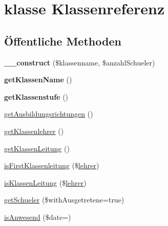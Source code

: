 \hypertarget{classklasse}{}\section{klasse Klassenreferenz}
\label{classklasse}
\subsection*{Öffentliche Methoden}
\begin{DoxyCompactItemize}
\item 
\mbox{\label{classklasse_a470f7dbc69c9b3dadac7ac68a5cf86ca}} 
{\bfseries \+\_\+\+\_\+construct} (\$klassenname, \$anzahl\+Schueler)
\item 
\mbox{\label{classklasse_ab82a9c3ea2ef364ca74f7b56ffb25ce2}} 
{\bfseries get\+Klassen\+Name} ()
\item 
\mbox{\label{classklasse_adee8673c2ad4ed4be48221f31452b8ef}} 
{\bfseries get\+Klassenstufe} ()
\item 
\mbox{\hyperlink{classklasse_ad27975ea62d4436f903e75b59aab9b9b}{get\+Ausbildungsrichtungen}} ()
\item 
\mbox{\hyperlink{classklasse_abc6acd9f1e5d5635b504547f0da348b5}{get\+Klassenlehrer}} ()
\item 
\mbox{\hyperlink{classklasse_ad250f20dadf7ea4c9c53d51574e30727}{get\+Klassen\+Leitung}} ()
\item 
\mbox{\hyperlink{classklasse_affbbbc2c8a36fd8524271447ba2972d3}{is\+First\+Klassenleitung}} (\$\mbox{\hyperlink{classlehrer}{lehrer}})
\item 
\mbox{\hyperlink{classklasse_a4bbd441df2f2d30245da9c653c704340}{is\+Klassen\+Leitung}} (\$\mbox{\hyperlink{classlehrer}{lehrer}})
\item 
\mbox{\hyperlink{classklasse_a4124b99ceefa3c8ebc1c79bd0e372a13}{get\+Schueler}} (\$with\+Ausgetretene=true)
\item 
\mbox{\hyperlink{classklasse_affa96d5d08f8c766aa72421026f90a46}{is\+Anwesend}} (\$date=\textquotesingle{}\textquotesingle{})
\end{DoxyCompactItemize}
